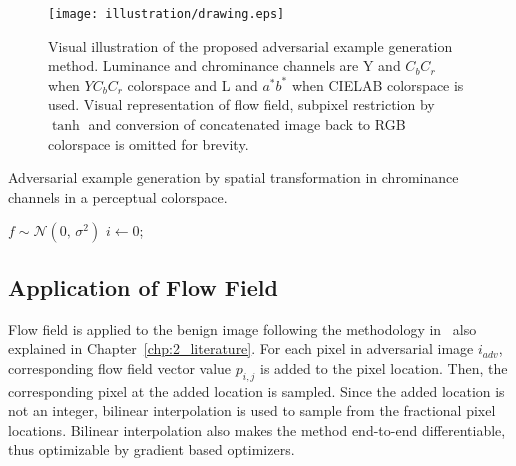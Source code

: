 \begin{figure*}[t]
    \centering
    \texttt{[image: illustration/drawing.eps]}
    \caption[Visual illustration of the proposed adversarial example generation method.]{Visual illustration of the proposed adversarial example generation method. Luminance and chrominance channels are Y and \(C_{b}C_{r}\) when \(YC_{b}C_{r}\) colorspace and L and \(a^*b^*\) when CIELAB colorspace is used. Visual representation of flow field, subpixel restriction by \(\tanh\) and conversion of concatenated image back to RGB colorspace is omitted for brevity.}\label{fig:algorithm}
\end{figure*}

\begin{algorithm}[t]
    \caption{Adversarial example generation by spatial transformation in chrominance channels in a perceptual colorspace. }\label{alg1}
    \(f \sim \mathcal{N}(0,\,\sigma^{2})\)\;
    \(i \gets 0\);

\end{algorithm}

\subsection{Application of Flow Field}
Flow field is applied to the benign image following the methodology in~\cite{xiao2018spatially} also explained in Chapter~\ref{chp:2_literature}. For each pixel in adversarial image \(i_{adv}\), corresponding flow field vector value \(p_{i,j}\) is added to the pixel location. Then, the corresponding pixel at the added location is sampled. Since the added location is not an integer, bilinear interpolation is used to sample from the fractional pixel locations. Bilinear interpolation also makes the method end-to-end differentiable, thus optimizable by gradient based optimizers.

